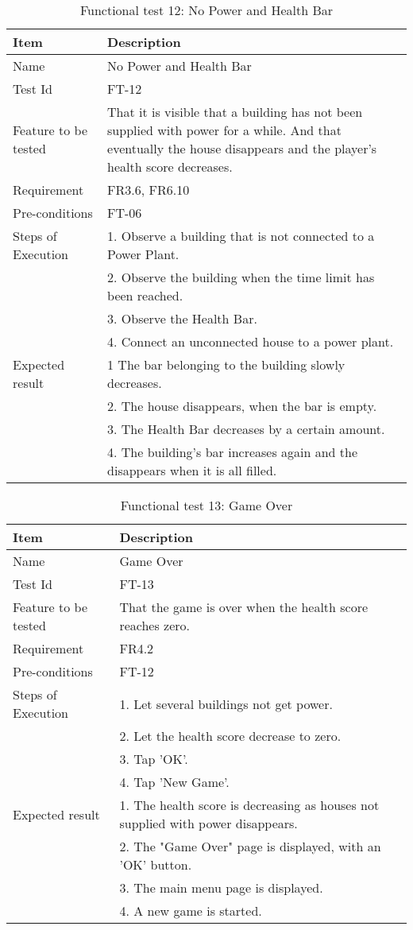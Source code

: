 \begin{table}[H]
\centering
	\begin{tabular}{ l | p{8cm} }
		\hline
		\rowcolor{lightgray}
		{\bf Item} & {\bf Description} \\ \hline
		Name & No Power and Health Bar \\ 
		Test Id & FT-12 \\ 
		Feature to be tested & That it is visible that a building has not been supplied with power for a while. And that eventually the house disappears and the player's health score decreases. \\
		Requirement & FR3.6, FR6.10 \\ 
		Pre-conditions & FT-06 \\ 
		Steps of Execution &  1. Observe a building that is not connected to a Power Plant. \\ 
		& 2. Observe the building when the time limit has been reached. \\
		& 3. Observe the Health Bar. \\
		& 4. Connect an unconnected house to a power plant. \\
		Expected result & 1 The bar belonging to the building slowly decreases. \\
		& 2. The house disappears, when the bar is empty. \\
		& 3. The Health Bar decreases by a certain amount. \\
		& 4. The building's bar increases again and the disappears when it is all filled. \\
		\hline
	\end{tabular}
	\caption{Functional test 12: No Power and Health Bar}
\end{table}

\begin{table}[H]
\centering
	\begin{tabular}{ l | p{8cm} }
		\hline
		\rowcolor{lightgray}
		{\bf Item} & {\bf Description} \\ \hline
		Name & Game Over \\ 
		Test Id & FT-13 \\ 
		Feature to be tested & That the game is over when the health score reaches zero. \\ 
		Requirement & FR4.2 \\ 
		Pre-conditions & FT-12 \\ 
		Steps of Execution & 1. Let several buildings not get power. \\ 
		& 2. Let the health score decrease to zero. \\
		& 3. Tap 'OK'. \\
		& 4. Tap 'New Game'. \\
		Expected result & 1. The health score is decreasing as houses not supplied with power disappears. \\
		& 2. The "Game Over" page is displayed, with an 'OK' button. \\
		& 3. The main menu page is displayed. \\
		& 4. A new game is started. \\
		\hline
	\end{tabular}
	\caption{Functional test 13: Game Over}
\end{table}

